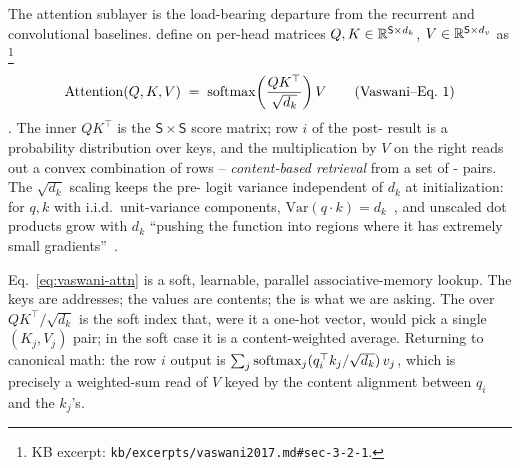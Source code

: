 The attention sublayer is the load-bearing departure from the
recurrent and convolutional baselines. \citet{vaswani2017} define
 on per-head matrices
$Q, K \in \mathbb{R}^{\mathsf{S} \times d_k}$, $V \in \mathbb{R}^{\mathsf{S} \times d_v}$
as%
\footnote{KB excerpt: \texttt{kb/excerpts/vaswani2017.md\#sec-3-2-1}.}
\begin{equation}
  \mathrm{Attention}(Q, K, V) \;=\;
  \operatorname{softmax}\!\left(\frac{Q K^\top}{\sqrt{d_k}}\right) V
  \tag{Vaswani--Eq.~1}
  \label{eq:vaswani-attn}
\end{equation}
\citep[\S 3.2.1, Eq.~1]{vaswani2017}. The inner $Q K^\top$ is the
$\mathsf{S} \times \mathsf{S}$ score matrix; row $i$ of the post-
result is a probability distribution over keys, and the multiplication
by $V$ on the right reads out a convex combination of  rows --
\emph{content-based retrieval} from a set of - pairs. The
$\sqrt{d_k}$ scaling keeps the pre- logit variance independent
of $d_k$ at initialization: for $q, k$ with i.i.d.\ unit-variance
components, $\mathrm{Var}(q \cdot k) = d_k$~\citep[\S 3.2.1, fn.~4]{vaswani2017}, and
unscaled dot products grow with $d_k$ ``pushing the  function
into regions where it has extremely small gradients''~\citep[\S
3.2.1]{vaswani2017}.

\begin{analogy}
Eq.~\eqref{eq:vaswani-attn} is a soft, learnable, parallel
associative-memory lookup. The keys are addresses; the values are
contents; the  is what we are asking. The  over
$Q K^\top / \sqrt{d_k}$ is the soft index that, were it a
one-hot vector, would pick a single $(K_j, V_j)$ pair; in the
soft case it is a content-weighted average. Returning to canonical
math: the row $i$ output is
$\sum_j \operatorname{softmax}_j(q_i^\top k_j / \sqrt{d_k}) \, v_j$,
which is precisely a weighted-sum read of $V$ keyed by the
content alignment between $q_i$ and the $k_j$'s.
\end{analogy}

